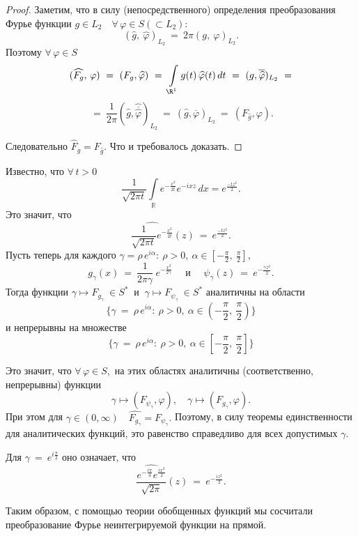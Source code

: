 \documentclass[a4paper]{article}
\newcommand{\ff} {\varphi}
\newcommand{\mro} {\R^1}
\newcommand{\inr} {\int \limits_{\mathbb R}}
\newcommand{\il} {\int\limits_}
\newcommand{\w}{\widehat}
\begin{document}
\begin{proof}
Заметим, что в силу (непосредственного) определения преобразования
Фурье функции $g\in L_2 \quad \forall \, \ff \in S (\subset L_2):$
$$
(\w{g}, \ \w{\ff})_{L_2}\ = \ 2 \pi (g, \ \ff)_{L_2}.
$$
Поэтому  $\forall \, \varphi \in S$
$$
(\w{F_g}, \, \ff)\ = \ (F_g, \w{\ff})\ = \ \il{\mro} g(t) \,
\w{\ff} (t) \, dt\ = \ (g, \overline{\w{\ff}})_{L_2}\ =
$$
$$
\ = \ \frac{1}{2 \pi} (\w{g}, \w{\overline{\w{\ff}}})_{L_2}\ = \
(\w{g}, \overline{\ff})_{L_2}\ =\  (F_{\w{g}}, \ff).
$$

Следовательно $\w{F}_g = F_{\w{g}}.$ Что и требовалось доказать.
\end{proof}
\begin{note}
Известно, что $\forall \, t > 0$
$$
\frac{1}{\sqrt{2 \pi t}} \inr e^{- \frac{x^2}{2t}} e^{-ixz} \, dx
= e^{\frac{- tz^2}{2}}.
$$
Это значит, что
$$
\w{\frac{1}{\sqrt{2 \pi t}} e^{- \frac{x^2}{2t}}} (z) \ = \ e^{\frac{- tz^2}{2}}.
$$
Пусть теперь для каждого $\gamma = \rho\, e^{i \alpha} \colon\
\rho > 0, \ \alpha \in \left[-\frac{\pi}{2}, \
\frac{\pi}{2}\right],$
$$
g_{\gamma} (x) \ = \ \frac{1}{2 \pi \gamma} \  e^{-\frac{x^2}{2
\gamma}} \quad \mbox{ и } \quad \psi_{\gamma} (z) \ = \
e^{-\frac{\gamma z^2}{2}}.
$$
Тогда функции $\gamma \mapsto F_{g_\gamma} \ \in S^{*}\ $ и $\
\gamma \mapsto F_{\psi_\gamma}\  \in S^{*}$ аналитичны на области
$$
\{\gamma\ = \ \rho \, e^{i \alpha} \colon\ \rho > 0, \ \alpha \in
\left(-\frac{\pi}{2}, \ \frac{\pi}{2}\right)\}
$$
и непрерывны на множестве
$$ \{\gamma\ = \ \rho \, e^{i \alpha}
\colon\ \rho > 0, \ \alpha \in \left[-\frac{\pi}{2}, \
\frac{\pi}{2}\right]\} $$

Это значит, что $\forall \, \ff \in S,$ на этих областях
аналитичны (соответственно, непрерывны) функции
$$
\gamma \mapsto (F_{\psi_\gamma}, \ff), \quad \gamma \mapsto
(F_{g_\gamma}, \ff).
$$
При этом для $\gamma \in (0, \infty)\quad \w{F_{g_\gamma}} =
F_{\psi_\gamma}.$ Поэтому, в силу теоремы единственности для
аналитических функций, это равенство справедливо для всех
допустимых $\gamma.$

Для $\gamma \ = \ e^{i \frac{\pi}{2}}$ оно означает, что
$$
\w{\frac{e^{- \frac{i \pi}{4}} e^{\frac{i x^2}{2}}}{\sqrt{2 \pi}}
}  (z) \ = \ e^{- \frac{i z^2}{2}}.
$$

Таким образом, с помощью теории обобщенных функций мы сосчитали
преобразование Фурье неинтегрируемой функции на прямой.
\end{note}
\end{document}
